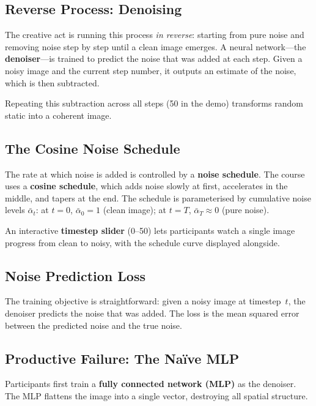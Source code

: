 \documentclass[11pt,a4paper]{article}
\begin{document}
\subsection{Reverse Process: Denoising}

The creative act is running this process \emph{in reverse}: starting from
pure noise and removing noise step by step until a clean image emerges.
A neural network---the \textbf{denoiser}---is trained to predict the noise
that was added at each step.  Given a noisy image and the current step
number, it outputs an estimate of the noise, which is then subtracted.

Repeating this subtraction across all steps (50 in the demo) transforms
random static into a coherent image.

\subsection{The Cosine Noise Schedule}

The rate at which noise is added is controlled by a \textbf{noise
schedule}.  The course uses a \textbf{cosine schedule}, which adds noise
slowly at first, accelerates in the middle, and tapers at the end.  The
schedule is parameterised by cumulative noise levels $\bar{\alpha}_t$:
at $t = 0$, $\bar{\alpha}_0 = 1$ (clean image); at $t = T$,
$\bar{\alpha}_T \approx 0$ (pure noise).

An interactive \textbf{timestep slider} (0--50) lets participants watch a
single image progress from clean to noisy, with the schedule curve
displayed alongside.

\subsection{Noise Prediction Loss}

The training objective is straightforward: given a noisy image at
timestep~$t$, the denoiser predicts the noise that was added.  The loss
is the mean squared error between the predicted noise and the true noise.

\subsection{Productive Failure: The Na\"ive MLP}

Participants first train a \textbf{fully connected network (MLP)} as the
denoiser.  The MLP flattens the image into a single vector, destroying
all spatial structure.
\end{document}
